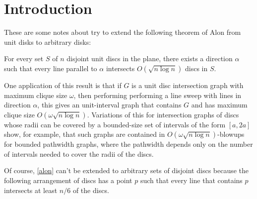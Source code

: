 \documentclass{patmorin}
\begin{document}
\section{Introduction}

These are some notes about try to extend the following theorem of Alon from unit disks to arbitrary disks:

\begin{thm}[Alon]\label{alon}
  For every set $S$ of $n$ disjoint unit discs in the plane, there exists a direction $\alpha$ such that every line parallel to $\alpha$ intersects $O(\sqrt{n\log n})$ discs in $S$.
\end{thm}

One application of this result is that if $G$ is a unit disc intersection graph with maximum clique size $\omega$, then performing performing a line sweep with lines in direction $\alpha$, this gives an unit-interval graph that contains $G$ and has maximum clique size $O(\omega \sqrt{n\log n})$.  Variations of this for intersection graphs of discs whose radii can be covered by a bounded-size set of intervals of the form $[a,2a]$ show, for example, that such graphs are contained in $O(\omega\sqrt{n\log n})$-blowups for bounded pathwidth graphs, where the pathwidth depends only on the number of intervals needed to cover the radii of the discs.

Of course, \cref{alon} can't be extended to arbitrary sets of disjoint discs because the following arrangement of discs has a point $p$ such that every line that contains $p$ intersects at least $n/6$ of the discs.
\end{document}
